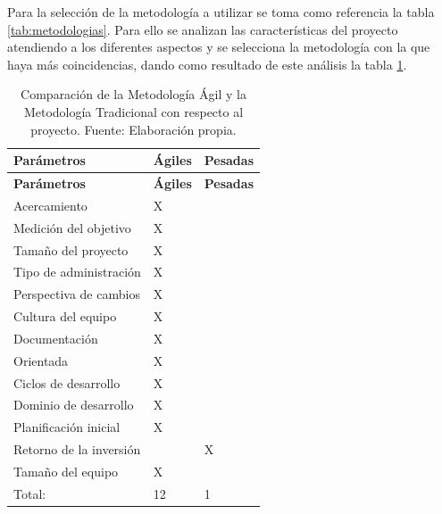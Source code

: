 Para la selección de la metodología a utilizar se toma como referencia 
la tabla \ref{tab:metodologias}. Para ello se analizan las características del proyecto 
atendiendo a los diferentes aspectos y se selecciona la metodología con la que haya 
más coincidencias, dando como resultado de este análisis la tabla \ref{tab:resultado}.
    
\begin{longtable}{|p{4cm}|p{2cm}|p{2cm}|}
	\caption[Comparación de la Metodología Ágil y la Metodología Tradicional con respecto al proyecto.]{Comparación de la Metodología Ágil y la Metodología Tradicional con respecto al proyecto. Fuente: Elaboración propia.}
	\label{tab:resultado} \\
    	
    \hline
    \rowcolor[HTML]{CBCEFB} 
    \textbf{Parámetros} & \textbf{Ágiles} & \textbf{Pesadas} \\
    \hline
    \endfirsthead
    	
    \hline
    \rowcolor[HTML]{CBCEFB} 
    \textbf{Parámetros} & \textbf{Ágiles} & \textbf{Pesadas} \\
    \hline
    \endhead
    	
    Acercamiento & X & \\ 
    \hline
    \rowcolor[HTML]{EDEBF1}
    Medición del objetivo & X & \\ 
    \hline
    Tamaño del proyecto & X & \\ 
    \hline
    \rowcolor[HTML]{EDEBF1}
    Tipo de administración & X & \\ 
    \hline
    Perspectiva de cambios & X & \\ 
    \hline
    \rowcolor[HTML]{EDEBF1}
    Cultura del equipo & X & \\ 
    \hline
    Documentación & X & \\ 
    \hline
    \rowcolor[HTML]{EDEBF1}
    Orientada & X & \\ 
    \hline
    Ciclos de desarrollo & X & \\ 
    \hline
    \rowcolor[HTML]{EDEBF1}
    Dominio de desarrollo & X & \\ 
    \hline
    Planificación inicial & X & \\ 
    \hline
    \rowcolor[HTML]{EDEBF1}
    Retorno de la inversión &  & X \\ 
    \hline
    Tamaño del equipo & X & \\ 
    \hline
    \rowcolor[HTML]{EDEBF1}
    Total: & 12 & 1 \\ 
    \hline
\end{longtable}
    
